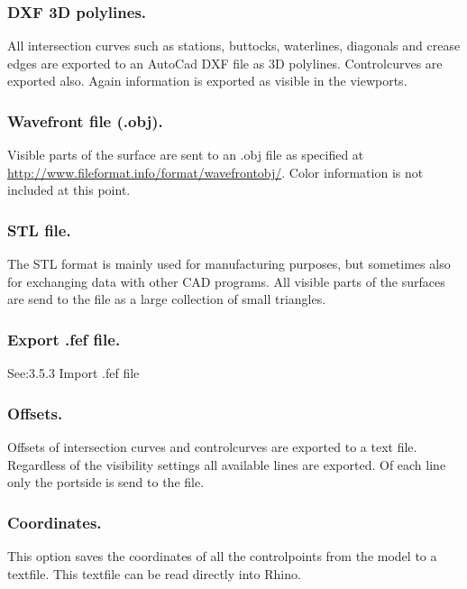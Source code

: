 \documentclass[12pt]{article}
\begin{document}
\subsubsection{DXF 3D polylines.}
All intersection curves such as stations, buttocks, waterlines, diagonals and crease edges are
exported to an AutoCad DXF file as 3D polylines. Controlcurves are exported also. Again
information is exported as visible in the viewports.

\subsubsection{Wavefront file (.obj).}
Visible parts of the surface are sent to an .obj file as specified at
\url{http://www.fileformat.info/format/wavefrontobj/}. Color information is not included at this point.

\subsubsection{STL file.}
The STL format is mainly used for manufacturing purposes, but sometimes also for exchanging
data with other CAD programs. All visible parts of the surfaces are send to the file as a large
collection of small triangles.

\subsubsection{Export .fef file.}
See:3.5.3 Import .fef file

\subsubsection{Offsets.}
Offsets of intersection curves and controlcurves are exported to a text file. Regardless of the
visibility settings all available lines are exported. Of each line only the portside is send to the file.

\subsubsection{Coordinates.}
This option saves the coordinates of all the controlpoints from the model to a textfile. This textfile
can be read directly into Rhino.
\end{document}
